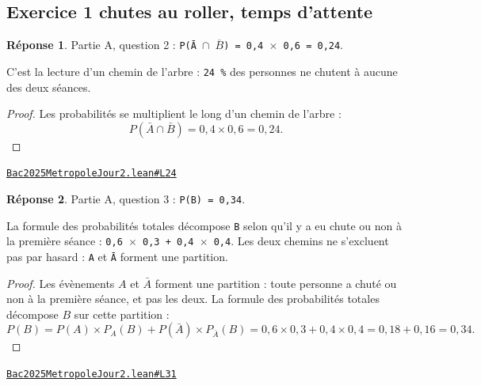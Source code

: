 \documentclass[11pt,a4paper]{article}
\theoremstyle{definition}
\theoremstyle{plain}
\theoremstyle{definition}
\newtheorem*{reponse}{Réponse}
\newcommand{\source}[2]{\par\smallskip\noindent\hfill{\footnotesize\href{#1}{\texttt{#2}}}\par\smallskip}
\begin{document}
\subsection{Exercice 1 \textemdash{} chutes au roller, temps d'attente}

\begin{reponse}
Partie A, question 2 : \texttt{P(Ā \(\cap\) \(\overline{B}\)) = 0,4 \(\times\) 0,6 = 0,24}.

C'est la lecture d'un chemin de l'arbre : \texttt{24 \%} des personnes ne chutent à aucune des
deux séances.
\end{reponse}
\begin{proof}
Les probabilités se multiplient le long d'un chemin de l'arbre :
\[ P(\bar{A} \cap \bar{B}) = 0{,}4 \times 0{,}6 = 0{,}24 . \]
\end{proof}
\source{https://github.com/Commutator-IO/learn-lean/blob/main/exams/2025/Bac2025MetropoleJour2.lean\#L24}{Bac2025MetropoleJour2.lean\#L24}

\begin{reponse}
Partie A, question 3 : \texttt{P(B) = 0,34}.

La formule des probabilités totales décompose \texttt{B} selon qu'il y a eu chute ou non à la
première séance : \texttt{0,6 \(\times\) 0,3 + 0,4 \(\times\) 0,4}. Les deux chemins ne s'excluent pas par
hasard : \texttt{A} et \texttt{Ā} forment une partition.
\end{reponse}
\begin{proof}
Les évènements $A$ et $\bar{A}$ forment une partition : toute personne a chuté ou non à la
première séance, et pas les deux. La formule des probabilités totales décompose $B$ sur
cette partition :
\[ P(B) = P(A) \times P_A(B) + P(\bar{A}) \times P_{\bar{A}}(B)
   = 0{,}6 \times 0{,}3 + 0{,}4 \times 0{,}4 = 0{,}18 + 0{,}16 = 0{,}34 . \]
\end{proof}
\source{https://github.com/Commutator-IO/learn-lean/blob/main/exams/2025/Bac2025MetropoleJour2.lean\#L31}{Bac2025MetropoleJour2.lean\#L31}
\end{document}
